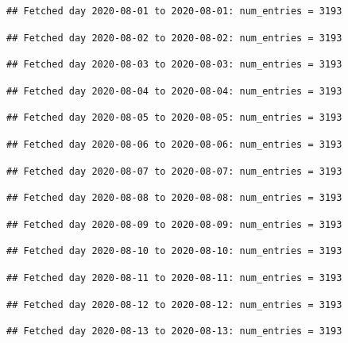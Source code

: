 \documentclass[]{article}
\begin{document}
\begin{verbatim}
## Fetched day 2020-08-01 to 2020-08-01: num_entries = 3193
\end{verbatim}

\begin{verbatim}
## Fetched day 2020-08-02 to 2020-08-02: num_entries = 3193
\end{verbatim}

\begin{verbatim}
## Fetched day 2020-08-03 to 2020-08-03: num_entries = 3193
\end{verbatim}

\begin{verbatim}
## Fetched day 2020-08-04 to 2020-08-04: num_entries = 3193
\end{verbatim}

\begin{verbatim}
## Fetched day 2020-08-05 to 2020-08-05: num_entries = 3193
\end{verbatim}

\begin{verbatim}
## Fetched day 2020-08-06 to 2020-08-06: num_entries = 3193
\end{verbatim}

\begin{verbatim}
## Fetched day 2020-08-07 to 2020-08-07: num_entries = 3193
\end{verbatim}

\begin{verbatim}
## Fetched day 2020-08-08 to 2020-08-08: num_entries = 3193
\end{verbatim}

\begin{verbatim}
## Fetched day 2020-08-09 to 2020-08-09: num_entries = 3193
\end{verbatim}

\begin{verbatim}
## Fetched day 2020-08-10 to 2020-08-10: num_entries = 3193
\end{verbatim}

\begin{verbatim}
## Fetched day 2020-08-11 to 2020-08-11: num_entries = 3193
\end{verbatim}

\begin{verbatim}
## Fetched day 2020-08-12 to 2020-08-12: num_entries = 3193
\end{verbatim}

\begin{verbatim}
## Fetched day 2020-08-13 to 2020-08-13: num_entries = 3193
\end{verbatim}
\end{document}
